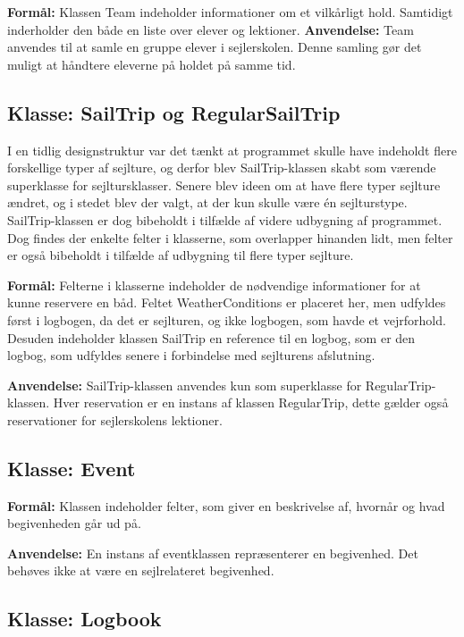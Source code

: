 \textbf{Formål:}
Klassen Team indeholder informationer om et vilkårligt hold. 
Samtidigt inderholder den både en liste over elever og lektioner.
\textbf{Anvendelse:}
Team anvendes til at samle en gruppe elever i sejlerskolen.
Denne samling gør det muligt at håndtere eleverne på holdet på samme tid.

\subsection*{Klasse: SailTrip og RegularSailTrip}

I en tidlig designstruktur var det tænkt at programmet skulle have indeholdt flere forskellige typer af sejlture, og derfor blev SailTrip-klassen skabt som værende superklasse for sejltursklasser. 
Senere blev ideen om at have flere typer sejlture ændret, og i stedet blev der valgt, at der kun skulle være én sejlturstype. 
SailTrip-klassen er dog bibeholdt i tilfælde af videre udbygning af programmet.
Dog findes der enkelte felter i klasserne, som overlapper hinanden lidt, men felter er også bibeholdt i tilfælde af udbygning til flere typer sejlture.

\textbf{Formål:}
Felterne i klasserne indeholder de nødvendige informationer for at kunne reservere en båd.
Feltet WeatherConditions er placeret her, men udfyldes først i logbogen, da det er sejlturen, og ikke logbogen, som havde et vejrforhold.
Desuden indeholder klassen SailTrip en reference til en logbog, som er den logbog, som udfyldes senere i forbindelse med sejlturens afslutning.

\textbf{Anvendelse:}
SailTrip-klassen anvendes kun som superklasse for RegularTrip-klassen. 
Hver reservation er en instans af klassen RegularTrip, dette gælder også reservationer for sejlerskolens lektioner.

\subsection*{Klasse: Event}

\textbf{Formål:}
Klassen indeholder felter, som giver en beskrivelse af, hvornår og hvad begivenheden går ud på. 

\textbf{Anvendelse:}
En instans af eventklassen repræsenterer en begivenhed. 
Det behøves ikke at være en sejlrelateret begivenhed.

\subsection*{Klasse: Logbook}

